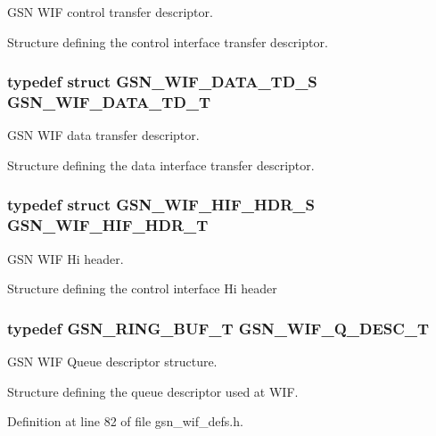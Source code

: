 GSN WIF control transfer descriptor. 

Structure defining the control interface transfer descriptor. \hypertarget{a00638_ga906c7cc219265ee9c61f1487fcd1bfcd}{
\subsubsection[{GSN\_\-WIF\_\-DATA\_\-TD\_\-T}]{\setlength{\rightskip}{0pt plus 5cm}typedef struct {\bf GSN\_\-WIF\_\-DATA\_\-TD\_\-S}  {\bf GSN\_\-WIF\_\-DATA\_\-TD\_\-T}}}
\label{a00638_ga906c7cc219265ee9c61f1487fcd1bfcd}


GSN WIF data transfer descriptor. 

Structure defining the data interface transfer descriptor. \hypertarget{a00638_gaccb177e96466ed182b099685113c9f70}{
\subsubsection[{GSN\_\-WIF\_\-HIF\_\-HDR\_\-T}]{\setlength{\rightskip}{0pt plus 5cm}typedef struct {\bf GSN\_\-WIF\_\-HIF\_\-HDR\_\-S}  {\bf GSN\_\-WIF\_\-HIF\_\-HDR\_\-T}}}
\label{a00638_gaccb177e96466ed182b099685113c9f70}


GSN WIF Hi header. 

Structure defining the control interface Hi header \hypertarget{a00638_ga0cd2d946cd64e99973998fcac7dfc244}{
\subsubsection[{GSN\_\-WIF\_\-Q\_\-DESC\_\-T}]{\setlength{\rightskip}{0pt plus 5cm}typedef {\bf GSN\_\-RING\_\-BUF\_\-T} {\bf GSN\_\-WIF\_\-Q\_\-DESC\_\-T}}}
\label{a00638_ga0cd2d946cd64e99973998fcac7dfc244}


GSN WIF Queue descriptor structure. 

Structure defining the queue descriptor used at WIF. 

Definition at line 82 of file gsn\_\-wif\_\-defs.h.

